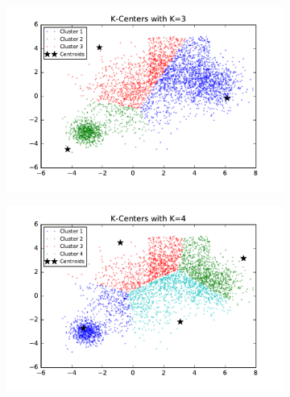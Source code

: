 \begin{figure}[htb]
        \centering
        \begin{subfigure}[b]{0.475\textwidth}
            \centering
            \includegraphics[width=\textwidth]{./figures/bigClustering_kCenter_3.pdf}
        \end{subfigure}
        \hfill
        \begin{subfigure}[b]{0.475\textwidth}  
            \centering 
            \includegraphics[width=\textwidth]{./figures/bigClustering_kCenter_4.pdf}
        \end{subfigure}
        \begin{subfigure}[b]{0.475\textwidth}  
            \centering 

\end{subfigure}
\end{figure}
